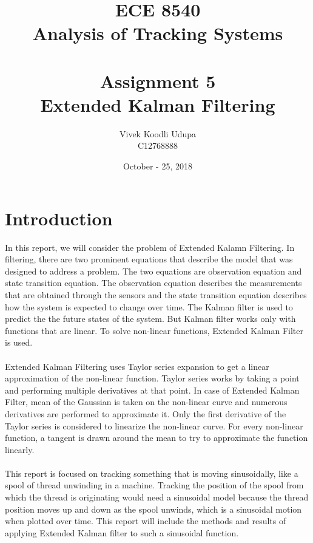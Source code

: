 \documentclass[12pt]{article}
\title{ECE 8540 \\ Analysis of Tracking Systems \\ \quad \\
	Assignment 5 \\ Extended Kalman Filtering}
\author{Vivek Koodli Udupa \\ C12768888}
\date{October - 25, 2018 }
\begin{document}
\begin{mdframed}
\maketitle
\end{mdframed}


\section{Introduction}
In this report, we will consider the problem of Extended Kalamn Filtering. In filtering, there are two prominent equations that describe the model that was designed to address a problem. The two equations are observation equation and state transition equation. The observation equation describes the measurements that are obtained through the sensors and the state transition equation describes how the system is expected to change over time. The Kalman filter is used to predict the the future states of the system. But Kalman filter works only with functions that are linear. To solve non-linear functions, Extended Kalman Filter is used. \\ 
\\ \indent
Extended Kalman Filtering uses Taylor series expansion to get a linear approximation of the non-linear function. Taylor series works by taking a point and performing multiple derivatives at that point. In case of Extended Kalman Filter, mean of the Gaussian is taken on the non-linear curve and numerous derivatives are performed to approximate it. Only the first derivative of the Taylor series is considered to linearize the non-linear curve. For every non-linear function, a tangent is drawn around the mean to try to approximate the function linearly. \\ 
\\ \indent
This report is focused on tracking something that is moving sinusoidally, like a spool of thread unwinding in a machine. Tracking the position of the spool from which the thread is originating would need a sinusoidal model because the thread position moves up and down as the spool unwinds, which is a sinusoidal motion when plotted over time. This report will include the methods and results of applying Extended Kalman filter to such a sinusoidal function.
\end{document}
